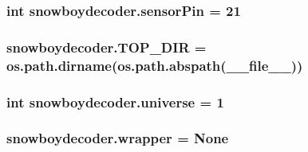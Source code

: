 \subsubsection[{\texorpdfstring{sensor\+Pin}{sensorPin}}]{\setlength{\rightskip}{0pt plus 5cm}int snowboydecoder.\+sensor\+Pin = 21}\hypertarget{namespacesnowboydecoder_ac46fb99e7686e837e61ba699cf11533d}{}\label{namespacesnowboydecoder_ac46fb99e7686e837e61ba699cf11533d}
\subsubsection[{\texorpdfstring{T\+O\+P\+\_\+\+D\+IR}{TOP_DIR}}]{\setlength{\rightskip}{0pt plus 5cm}snowboydecoder.\+T\+O\+P\+\_\+\+D\+IR = os.\+path.\+dirname(os.\+path.\+abspath(\+\_\+\+\_\+file\+\_\+\+\_\+))}\hypertarget{namespacesnowboydecoder_a1e552ae6ff3e3ebc614f0a9256394cce}{}\label{namespacesnowboydecoder_a1e552ae6ff3e3ebc614f0a9256394cce}
\subsubsection[{\texorpdfstring{universe}{universe}}]{\setlength{\rightskip}{0pt plus 5cm}int snowboydecoder.\+universe = 1}\hypertarget{namespacesnowboydecoder_a77e3c46725ed8a9726c69109608217dc}{}\label{namespacesnowboydecoder_a77e3c46725ed8a9726c69109608217dc}
\subsubsection[{\texorpdfstring{wrapper}{wrapper}}]{\setlength{\rightskip}{0pt plus 5cm}snowboydecoder.\+wrapper = None}\hypertarget{namespacesnowboydecoder_abd498a60cff1cc4bc6fcca373c2b492f}{}\label{namespacesnowboydecoder_abd498a60cff1cc4bc6fcca373c2b492f}
